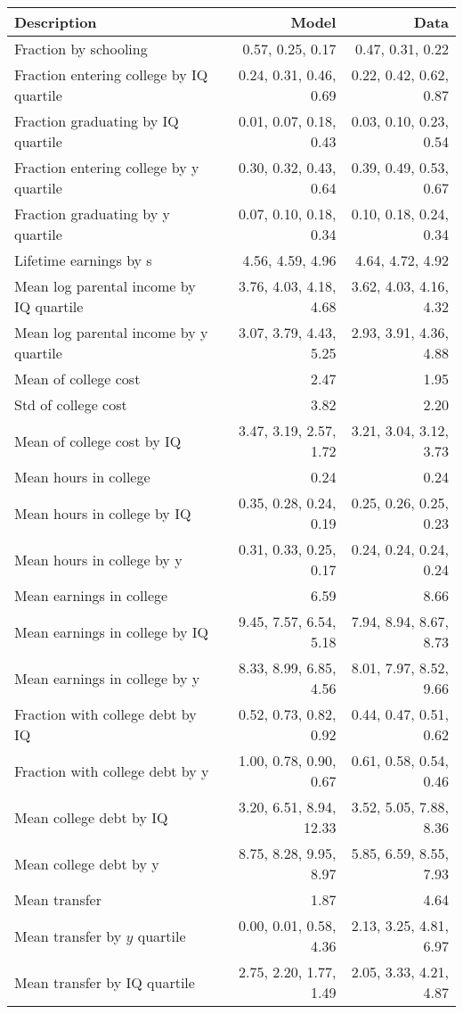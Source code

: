 \begin{tabular}{lrr}
\hline
Description & Model  & Data  \\
\hline
Fraction by schooling & 0.57, 0.25, 0.17  & 0.47, 0.31, 0.22  \\
Fraction entering college by IQ quartile & 0.24, 0.31, 0.46, 0.69  & 0.22, 0.42, 0.62, 0.87  \\
Fraction graduating by IQ quartile & 0.01, 0.07, 0.18, 0.43  & 0.03, 0.10, 0.23, 0.54  \\
Fraction entering college by y quartile & 0.30, 0.32, 0.43, 0.64  & 0.39, 0.49, 0.53, 0.67  \\
Fraction graduating by y quartile & 0.07, 0.10, 0.18, 0.34  & 0.10, 0.18, 0.24, 0.34  \\
Lifetime earnings by s & 4.56, 4.59, 4.96  & 4.64, 4.72, 4.92  \\
Mean log parental income by IQ quartile & 3.76, 4.03, 4.18, 4.68  & 3.62, 4.03, 4.16, 4.32  \\
Mean log parental income by y quartile & 3.07, 3.79, 4.43, 5.25  & 2.93, 3.91, 4.36, 4.88  \\
Mean of college cost & 2.47  & 1.95  \\
Std of college cost & 3.82  & 2.20  \\
Mean of college cost by IQ & 3.47, 3.19, 2.57, 1.72  & 3.21, 3.04, 3.12, 3.73  \\
Mean hours in college & 0.24  & 0.24  \\
Mean hours in college by IQ & 0.35, 0.28, 0.24, 0.19  & 0.25, 0.26, 0.25, 0.23  \\
Mean hours in college by y & 0.31, 0.33, 0.25, 0.17  & 0.24, 0.24, 0.24, 0.24  \\
Mean earnings in college & 6.59  & 8.66  \\
Mean earnings in college by IQ & 9.45, 7.57, 6.54, 5.18  & 7.94, 8.94, 8.67, 8.73  \\
Mean earnings in college by y & 8.33, 8.99, 6.85, 4.56  & 8.01, 7.97, 8.52, 9.66  \\
Fraction with college debt by IQ & 0.52, 0.73, 0.82, 0.92  & 0.44, 0.47, 0.51, 0.62  \\
Fraction with college debt by y & 1.00, 0.78, 0.90, 0.67  & 0.61, 0.58, 0.54, 0.46  \\
Mean college debt by IQ & 3.20, 6.51, 8.94, 12.33  & 3.52, 5.05, 7.88, 8.36  \\
Mean college debt by y & 8.75, 8.28, 9.95, 8.97  & 5.85, 6.59, 8.55, 7.93  \\
Mean transfer & 1.87  & 4.64  \\
Mean transfer by $y$ quartile & 0.00, 0.01, 0.58, 4.36  & 2.13, 3.25, 4.81, 6.97  \\
Mean transfer by IQ quartile & 2.75, 2.20, 1.77, 1.49  & 2.05, 3.33, 4.21, 4.87  \\
\hline
\end{tabular}%
